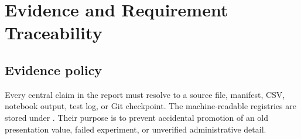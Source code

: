 \chapter{Evidence and Requirement Traceability}
\label{app:traceability}

\section{Evidence policy}

Every central claim in the report must resolve to a source file, manifest, CSV, notebook output, test log, or Git checkpoint. The machine-readable registries are stored under . Their purpose is to prevent accidental promotion of an old presentation value, failed experiment, or unverified administrative detail.

